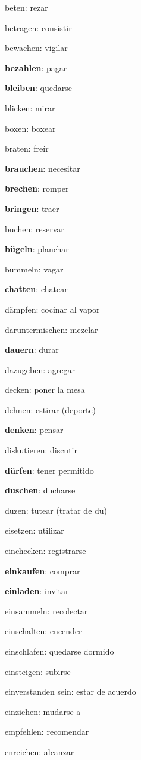 \begin{multicols}{2}
\begin{myitemize}
\item beten: rezar
\item betragen: consistir
\item bewachen: vigilar
\item \textbf{bezahlen}: pagar
\item \textbf{bleiben}: quedarse
\item blicken: mirar
\item boxen: boxear
\item braten: freír
\item \textbf{brauchen}: necesitar
\item \textbf{brechen}: romper
\item \textbf{bringen}: traer
\item buchen: reservar
\item \textbf{bügeln}: planchar
\item bummeln: vagar
\item \textbf{chatten}: chatear
\item dämpfen: cocinar al vapor
\item daruntermischen: mezclar
\item \textbf{dauern}: durar
\item dazugeben: agregar
\item decken: poner la mesa
\item dehnen: estirar (deporte)
\item \textbf{denken}: pensar
\item diskutieren: discutir
\item \textbf{dürfen}: tener permitido
\item \textbf{duschen}: ducharse
\item duzen: tutear (tratar de du)
\item eisetzen: utilizar
\item einchecken: registrarse
\item \textbf{einkaufen}: comprar
\item \textbf{einladen}: invitar
\item einsammeln: recolectar
\item einschalten: encender
\item einschlafen: quedarse dormido
\item einsteigen: subirse
\item einverstanden sein: estar de acuerdo
\item einziehen: mudarse a
\item empfehlen: recomendar
\item enreichen: alcanzar

\end{myitemize}
\end{multicols}

